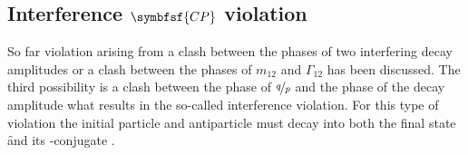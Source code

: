 \subsection[head={Interference \CP violation},tocentry={Interference \CP violation}]{Interference $\symbfsf{C{}P}$ violation}
\label{sec:InterferenceCPV}

So far \CP violation arising from a clash between the phases of two interfering decay amplitudes or a clash between the phases of $m_{12}$ and $\Gamma_{12}$ has been discussed.
The third possibility is a clash between the phase of $\nicefrac{q}{p}$ and the phase of the decay amplitude what results in the so-called interference \CP violation.
For this type of \CP violation the initial particle \Paz and antiparticle \Pazb must decay into both the final state \f and its \CP-conjugate \fbar.

